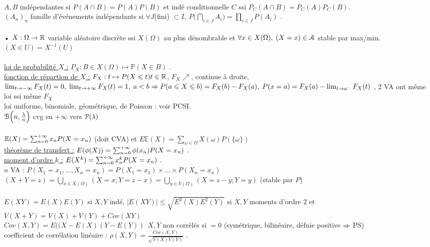 \documentclass[12 pt]{book}
\begin{document}
\text{}\\
$A, B$ indépendantes si $P(A\cap B) = P(A)P(B)$ et indé conditionnelle $C$ ssi $P_C(A\cap B) = P_C(A)P_C(B)$.\\
$(A_n)_n$ famille d'événements indépendants si $\forall J$(fini) $\subset I, \ P\Big( \bigcap_{i\in J} A_i\Big) = \prod_{i\in J} P(A_i)$ .\\
\text{}\\
• $X: \Omega \to \mathbb{R}$ variable aléatoire discrète ssi $X(\Omega)$ au plus dénombrable et $\forall x\in X(\Omega), \; (X=x)\in \mathcal{A}$ stable par max/min. \qquad \qquad $(X\in U)=X^{-1}(U)$\\
\text{}\\
\underline{loi de probabilité $X$ :} $P_X : B\in X(\Omega) \mapsto \mathbb{P}(X\in B)$ .\\
\underline{fonction de répartion de $X$ :} $F_X : t\mapsto P(X\leqslant t) t\in\mathbb{R}$, $F_X \nearrow$, continue à droite, $\lim_{t\to-\infty} F_X(t) = 0, \; \lim_{t\to+\infty} F_X(t) =1, \; a<b \Rightarrow P(a\leqslant X\leqslant b) = F_X(b) - F_X(a), \; P(x=a) = F_X(a) - \lim_{t\to a^-}F_X(t)$ , 2 VA ont même loi ssi même $F_X$\\
loi uniforme, binomiale, géométrique, de Poisson : voir PCSI.\\
$\mathcal{B}\Big(n,\frac{\lambda}{n}\Big)$ cvg en $+\infty$ vers $\mathcal{P}(\lambda)$\\
\text{}\\
$\mathbb{E}(X) = \sum_{n=0}^{+\infty} x_n P(X=x_n)$ (doit CVA) et $E\mathbb{E}(X) = \sum_{\omega\in\Omega} X(\omega)P(\{\omega\})$\\
\underline{théorème de transfert :} $E(\phi(X)) = \sum_{n=0}^{+\infty} \phi(x_n) P(X=x_n)$ .\\
\underline{moment d'ordre $k$ :} $E(X^k) = \sum_{n=0}^{+\infty} x_n^k P(X=x_n)$ .\\
$n$ VA : $P(X_1 =x_1,\dots, X_n = x_n) = P(X_1 =x_1) \times \dots \times P(X_n = x_n)$\\
$(X+Y = z) = \bigcup_{x\in X(\Omega)} (X=x;Y=z-x) =  \bigcup_{y\in Y(\Omega)} (X=z-y;Y=y)$ \quad (stable par $P$)\\
\text{}\\
$E(XY) = E(X)E(Y)$ si $X,Y$ indé, $|E(XY)| \leqslant \sqrt{E^2(X)E^2(Y)}$ si $X,Y$ moments d'ordre 2 et $ V(X+Y) = V(X) + V(Y) + Cov(XY)$\\
$Cov(X,Y) = E((X-E(X)(Y-E(Y)) \ \ X,Y$ non corrélés si $=0$ (symétrique, bilinéaire, défnie positive $\Rightarrow$ PS)\\
coefficient de corrélation linéaire : $\rho(X,Y)  = \frac{Cov(X,Y)}{\sqrt{V(X)V(Y)}}$ .\\
\end{document}
